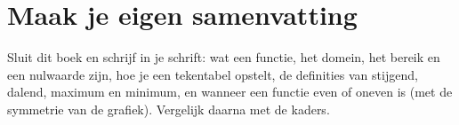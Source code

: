 
\begin{oefeningen}






\end{oefeningen}


\ifzelfstudie
\section*{Maak je eigen samenvatting}
Sluit dit boek en schrijf in je schrift: wat een functie, het domein, het bereik en een nulwaarde zijn, hoe je een tekentabel opstelt, de definities van stijgend, dalend, maximum en minimum, en wanneer een functie even of oneven is (met de symmetrie van de grafiek). Vergelijk daarna met de kaders.
\fi
